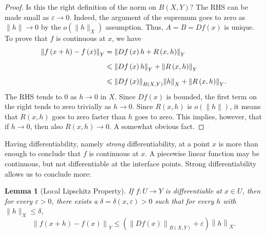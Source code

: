 \documentclass[letterpaper,twoside,12pt]{article}
\theoremstyle{mystyle}
\newtheorem{lemma}[theorem]{Lemma}
\newcommand{\cg}{\color{gray}}
\newcommand{\cbk}{\color{black}}
\newcommand{\cred}{\color{red}}
\newcommand{\ve}{\varepsilon}
\begin{document}
\begin{proof}
    \cred Is this the right definition of the norm on $B(X,Y)$? \cbk The RHS can be made small as $\ve \to 0$. Indeed, the argument of the supremum goes to zero as $\|h\| \to 0$ by the $o(\|h\|_X)$ assumption. Thus, $A = B = Df(x)$ is unique. 
    To prove that $f$ is continuous at $x$, we have 
    \begin{equation}
      \begin{split}
          {\left\| {f\left( {x + h} \right) - f\left( x \right)} \right\|_Y}& = {\left\| {Df\left( x \right)h + R\left( {x,h} \right)} \right\|_Y} \hfill \\[.2cm]
           &\leqslant {\left\| {Df\left( x \right)h} \right\|_Y} + {\left\| {R\left( {x,h} \right)} \right\|_Y} \hfill \\[.2cm]
           &\leqslant {\left\| {Df\left( x \right)} \right\|_{B\left( {X,Y} \right)}}{\left\| h \right\|_X} + {\left\| {R\left( {x,h} \right)} \right\|_Y}.
      \end{split}
    \end{equation}
    The RHS tends to $0$ as $h \to 0$ in $X$. \cg Since $Df(x)$ is bounded, the first term on the right tends to zero trivially as $h \to 0$. Since $R(x,h)$ is $o(\|h\|)$, it means that $R(x,h)$ goes to zero faster than $h$ goes to zero. This implies, however, that if $h\to 0$, then also $R(x, h) \to 0$. A somewhat obvious fact. \cbk 
  \end{proof}
  Having differentiability, namely \textit{strong} differentiability, at a point $x$ is more than enough to conclude that $f$ is continuous at $x$. A piecewise linear function may be continuous, but not differentiable at the interface points. Strong differentiability allows us to conclude more: 
  \begin{tcolorbox}[colback=red!5!white,colframe=red!75!black]
    \begin{lemma}[Local Lipschitz Property]
      If $f:U \to Y$ is differentiable at $x \in U$, then for every $\ve > 0$, there exists a $\delta = \delta(x, \ve) > 0$ such that for every $h$ with $\|h\|_X \leq \delta$, 
      \[{\left\| {f\left( {x + h} \right) - f\left( x \right)} \right\|_Y} \leqslant \left( {{{\left\| {Df\left( x \right)} \right\|}_{B\left( {X,Y} \right)}} + \varepsilon } \right){\left\| h \right\|_X}.\]
    \end{lemma} 
  \end{tcolorbox}
\end{document}
